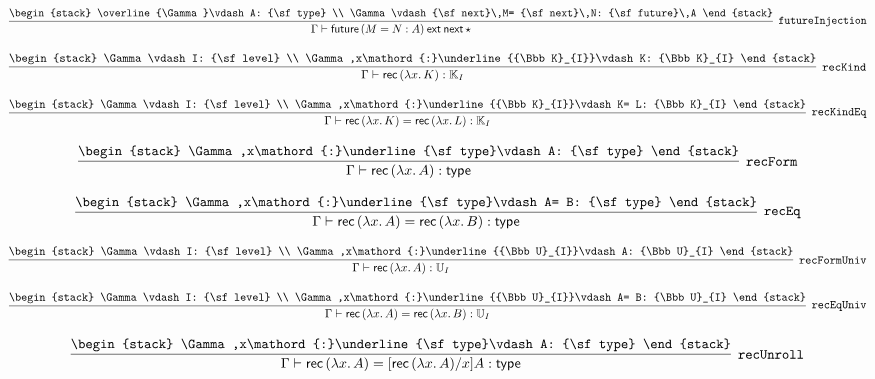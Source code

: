 \[
\infer[{\tt futureInjection}]{\Gamma \vdash {\sf future}\,(M= N: A)\:{\sf ext}\:{\sf next}\,\star }{
\begin{stack}
\overline{\Gamma}\vdash A: {\sf type}
\\
\Gamma \vdash {\sf next}\,M= {\sf next}\,N: {\sf future}\,A
\end{stack}}
\]

\[
\infer[{\tt recKind}]{\Gamma \vdash {\sf rec}\,(\lambda x.\,K): {\Bbb K}_{I}}{
\begin{stack}
\Gamma \vdash I: {\sf level}
\\
\Gamma ,x\mathord{:}\underline{{\Bbb K}_{I}}\vdash K: {\Bbb K}_{I}
\end{stack}}
\]

\[
\infer[{\tt recKindEq}]{\Gamma \vdash {\sf rec}\,(\lambda x.\,K)= {\sf rec}\,(\lambda x.\,L): {\Bbb K}_{I}}{
\begin{stack}
\Gamma \vdash I: {\sf level}
\\
\Gamma ,x\mathord{:}\underline{{\Bbb K}_{I}}\vdash K= L: {\Bbb K}_{I}
\end{stack}}
\]

\[
\infer[{\tt recForm}]{\Gamma \vdash {\sf rec}\,(\lambda x.\,A): {\sf type}}{
\begin{stack}
\Gamma ,x\mathord{:}\underline{\sf type}\vdash A: {\sf type}
\end{stack}}
\]

\[
\infer[{\tt recEq}]{\Gamma \vdash {\sf rec}\,(\lambda x.\,A)= {\sf rec}\,(\lambda x.\,B): {\sf type}}{
\begin{stack}
\Gamma ,x\mathord{:}\underline{\sf type}\vdash A= B: {\sf type}
\end{stack}}
\]

\[
\infer[{\tt recFormUniv}]{\Gamma \vdash {\sf rec}\,(\lambda x.\,A): {\Bbb U}_{I}}{
\begin{stack}
\Gamma \vdash I: {\sf level}
\\
\Gamma ,x\mathord{:}\underline{{\Bbb U}_{I}}\vdash A: {\Bbb U}_{I}
\end{stack}}
\]

\[
\infer[{\tt recEqUniv}]{\Gamma \vdash {\sf rec}\,(\lambda x.\,A)= {\sf rec}\,(\lambda x.\,B): {\Bbb U}_{I}}{
\begin{stack}
\Gamma \vdash I: {\sf level}
\\
\Gamma ,x\mathord{:}\underline{{\Bbb U}_{I}}\vdash A= B: {\Bbb U}_{I}
\end{stack}}
\]

\[
\infer[{\tt recUnroll}]{\Gamma \vdash {\sf rec}\,(\lambda x.\,A)= [{\sf rec}\,(\lambda x.\,A)/x]A: {\sf type}}{
\begin{stack}
\Gamma ,x\mathord{:}\underline{\sf type}\vdash A: {\sf type}
\end{stack}}
\]


